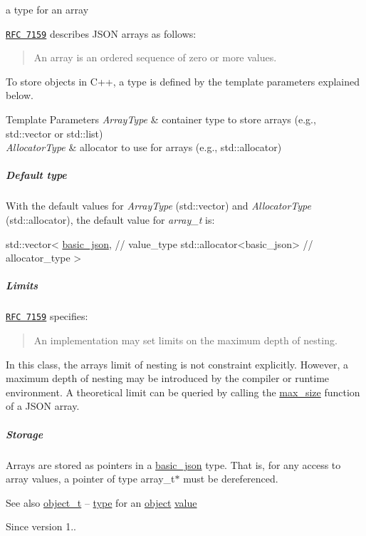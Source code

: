 a type for an array 

\href{http://rfc7159.net/rfc7159}{\tt R\+FC 7159} describes J\+S\+ON arrays as follows\+: \begin{quote}
An array is an ordered sequence of zero or more values. \end{quote}


To store objects in C++, a type is defined by the template parameters explained below.


\begin{DoxyTemplParams}{Template Parameters}
{\em Array\+Type} & container type to store arrays (e.\+g., {\ttfamily std\+::vector} or {\ttfamily std\+::list}) \\
\hline
{\em Allocator\+Type} & allocator to use for arrays (e.\+g., {\ttfamily std\+::allocator})\\
\hline
\end{DoxyTemplParams}
\subparagraph*{Default type}

With the default values for {\itshape Array\+Type} ({\ttfamily std\+::vector}) and {\itshape Allocator\+Type} ({\ttfamily std\+::allocator}), the default value for {\itshape array\+\_\+t} is\+:


\begin{DoxyCode}
std::vector<
  \hyperlink{a00025_a53771a7a4f2787125e55f64448f24ce6}{basic\_json}, \textcolor{comment}{// value\_type}
  std::allocator<basic\_json> \textcolor{comment}{// allocator\_type}
>
\end{DoxyCode}


\subparagraph*{Limits}

\href{http://rfc7159.net/rfc7159}{\tt R\+FC 7159} specifies\+: \begin{quote}
An implementation may set limits on the maximum depth of nesting. \end{quote}


In this class, the array\textquotesingle{}s limit of nesting is not constraint explicitly. However, a maximum depth of nesting may be introduced by the compiler or runtime environment. A theoretical limit can be queried by calling the \hyperlink{a00025_ad5514a7435f246fc5335856465022a7a}{max\+\_\+size} function of a J\+S\+ON array.

\subparagraph*{Storage}

Arrays are stored as pointers in a \hyperlink{a00025}{basic\+\_\+json} type. That is, for any access to array values, a pointer of type {\ttfamily array\+\_\+t$\ast$} must be dereferenced.

\begin{DoxySeeAlso}{See also}
\hyperlink{a00025_a0ac9894c9de8dc551cf2e5f1c605537f}{object\+\_\+t} -- \hyperlink{a00025_a848cbae3bd3502ffbf738320bf5eb3aa}{type} for an \hyperlink{a00025_ad25b2f8c21e241e2d63455537a9294ff}{object} \hyperlink{a00025_a0a2cbbd95862a623e7dc5c37e67dead0}{value}
\end{DoxySeeAlso}
\begin{DoxySince}{Since}
version 1.. 
\end{DoxySince}
